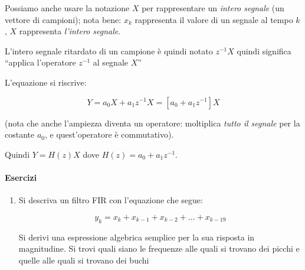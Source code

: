   Possiamo anche usare la notazione $X$ per rappresentare un \emph{intero segnale}
    (un vettore di campioni); nota bene: $x_k$ rappresenta il valore di un
    segnale al tempo $k$, $X$ rappresenta \emph{l'intero segnale}.

  L'intero segnale ritardato di un campione \`e quindi notato $z^{-1} X$ quindi
    significa ``applica l'operatore $z^{-1}$ al segnale $X$''

    L'equazione si riscrive:

     \begin{equation}
      Y = a_0 X + a_1 z^{-1} X = \left [ a_0 + a_1 z^{-1} \right ] X
     \end{equation}

    (nota che anche l'ampiezza diventa un operatore: moltiplica \emph{tutto il
    segnale} per la costante $a_0$, e quest'operatore \`e commutativo).

  Quindi $Y = H(z) X$ dove $H(z) = a_0 + a_1 z^{-1}$.


\paragraph{Esercizi}

\begin{enumerate}

  \item Si descriva un filtro FIR con l'equazione che segue:

          \begin{equation}
            y_k = x_k + x_{k-1} + x_{k-2} + \ldots + x_{k-19}
          \end{equation}

        Si derivi una espressione algebrica semplice per la sua risposta in
        magnitudine. Si trovi quali siano le frequenze alle quali si trovano
        dei picchi e quelle alle quali si trovano dei buchi

\end{enumerate}
